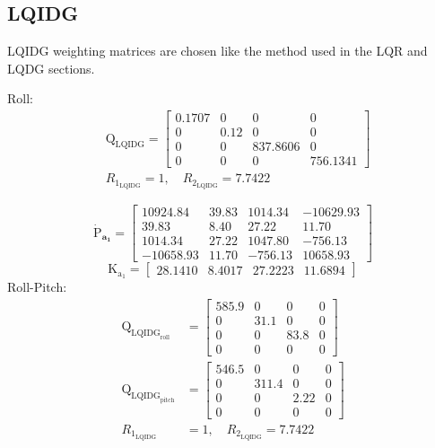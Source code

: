 \documentclass[conference]{IEEEtran}
\begin{document}
\subsection{LQIDG}
LQIDG weighting matrices are chosen like the method used in the LQR and LQDG sections.

Roll:
\begin{equation}
    \begin{split}
        &\boldsymbol{\mathrm{Q_{{\text{LQIDG}}}}} = \begin{bmatrix}
            0.1707 &0& 0& 0\\
            0 &  0.12 & 0 &0 \\
            0 & 0 & 837.8606 & 0\\
            0 & 0 & 0 & 756.1341
        \end{bmatrix}
        \\[1em]
        &R_{1_{\text{LQIDG}}} =  1, \quad R_{2_{\text{LQIDG}}} =  7.7422
    \end{split}
\end{equation}

\begin{equation}
	\boldsymbol{\dot{\mathrm{P}}_{a_1}} = \begin{bmatrix}
		10924.84&   39.83 & 1014.34 & -10629.93\\
		39.83   &  8.40 & 27.22& 11.70\\
		1014.34 &  27.22 & 1047.80 & -756.13\\
		-10658.93 & 11.70 & -756.13 & 10658.93
	\end{bmatrix}
\end{equation}
\begin{equation}
	\boldsymbol{\mathrm{K_{a_1}}} = \begin{bmatrix}
		28.1410 &   8.4017  & 27.2223  & 11.6894
	\end{bmatrix}
\end{equation}
Roll-Pitch:
\begin{equation}
	\begin{split}
		\boldsymbol{\mathrm{Q}}_{{\text{LQIDG}_{\text{roll}}}} &= \begin{bmatrix}
			585.9 &0& 0& 0\\
			0 &  31.1 & 0 &0 \\
			0 & 0 & 83.8 & 0\\
			0 & 0 & 0 & 0
		\end{bmatrix}\\[1em]
	    \boldsymbol{\mathrm{Q}}_{{\text{LQIDG}_{\text{pitch}}}} &= \begin{bmatrix}
		546.5 &0& 0& 0\\
		0 &  311.4 & 0 &0 \\
		0 & 0 & 2.22 & 0\\
		0 & 0 & 0 & 0
		\end{bmatrix}\\[1em]
	 R_{1_{\text{LQIDG}}} &=  1, \quad R_{2_{\text{LQIDG}}} =  7.7422
	\end{split}
\end{equation}
\end{document}
